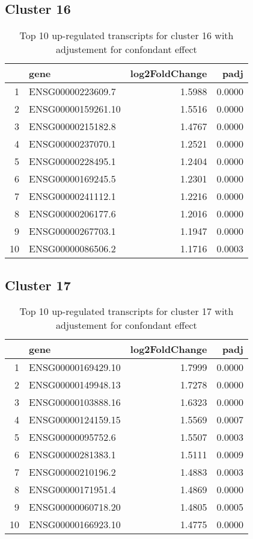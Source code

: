 \documentclass{article}
\begin{document}
\subsection{Cluster 16 }
\begin{table}[H]
\centering
\begin{tabular}{rlrr}
  \hline
 & gene & log2FoldChange & padj \\ 
  \hline
1 & ENSG00000223609.7 & 1.5988 & 0.0000 \\ 
  2 & ENSG00000159261.10 & 1.5516 & 0.0000 \\ 
  3 & ENSG00000215182.8 & 1.4767 & 0.0000 \\ 
  4 & ENSG00000237070.1 & 1.2521 & 0.0000 \\ 
  5 & ENSG00000228495.1 & 1.2404 & 0.0000 \\ 
  6 & ENSG00000169245.5 & 1.2301 & 0.0000 \\ 
  7 & ENSG00000241112.1 & 1.2216 & 0.0000 \\ 
  8 & ENSG00000206177.6 & 1.2016 & 0.0000 \\ 
  9 & ENSG00000267703.1 & 1.1947 & 0.0000 \\ 
  10 & ENSG00000086506.2 & 1.1716 & 0.0003 \\ 
   \hline
\end{tabular}
\caption{Top 10 up-regulated transcripts for cluster 16 with adjustement for confondant effect} 
\label{tab:q3_1_conf_16}
\end{table}
\subsection{Cluster 17 }
\begin{table}[H]
\centering
\begin{tabular}{rlrr}
  \hline
 & gene & log2FoldChange & padj \\ 
  \hline
1 & ENSG00000169429.10 & 1.7999 & 0.0000 \\ 
  2 & ENSG00000149948.13 & 1.7278 & 0.0000 \\ 
  3 & ENSG00000103888.16 & 1.6323 & 0.0000 \\ 
  4 & ENSG00000124159.15 & 1.5569 & 0.0007 \\ 
  5 & ENSG00000095752.6 & 1.5507 & 0.0003 \\ 
  6 & ENSG00000281383.1 & 1.5111 & 0.0009 \\ 
  7 & ENSG00000210196.2 & 1.4883 & 0.0003 \\ 
  8 & ENSG00000171951.4 & 1.4869 & 0.0000 \\ 
  9 & ENSG00000060718.20 & 1.4805 & 0.0005 \\ 
  10 & ENSG00000166923.10 & 1.4775 & 0.0000 \\ 
   \hline
\end{tabular}
\caption{Top 10 up-regulated transcripts for cluster 17 with adjustement for confondant effect} 
\label{tab:q3_1_conf_17}
\end{table}
\end{document}
